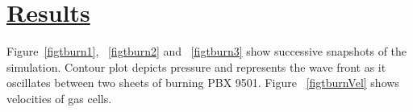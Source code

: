 \newpage

\section*{\underline{Results}}

Figure~\ref{figtburn1}, ~\ref{figtburn2} and ~\ref{figtburn3} show successive snapshots of the simulation.  Contour plot depicts pressure and represents the wave front as it oscillates between two sheets of burning PBX 9501.  Figure ~\ref{figtburnVel} shows velocities of gas cells.






